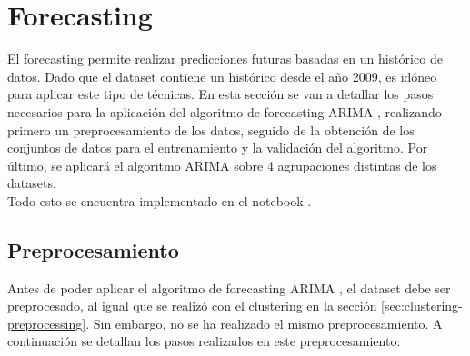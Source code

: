 
\section{Forecasting}
\label{sec:results-forecasting}

El forecasting permite realizar predicciones futuras basadas en un histórico de datos. Dado que el dataset \citep{dataset} contiene un histórico desde el año 2009, es idóneo para aplicar este tipo de técnicas. En esta sección se van a detallar los pasos necesarios para la aplicación del algoritmo de forecasting ARIMA \citep{arima}, realizando primero un preprocesamiento de los datos, seguido de la obtención de los conjuntos de datos para el entrenamiento y la validación del algoritmo. Por último, se aplicará el algoritmo ARIMA sobre 4 agrupaciones distintas de los datasets. \\

Todo esto se encuentra implementado en el notebook  \citep{master}.



\subsection{Preprocesamiento}

Antes de poder aplicar el algoritmo de forecasting ARIMA \citep{arima}, el dataset debe ser preprocesado, al igual que se realizó con el clustering en la sección \ref{sec:clustering-preprocessing}. Sin embargo, no se ha realizado el mismo preprocesamiento. A continuación se detallan los pasos realizados en este preprocesamiento:

